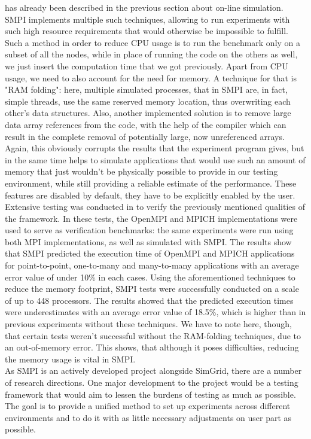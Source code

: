 has already been described in the previous section about on-line
simulation. SMPI implements multiple such techniques, allowing to run
experiments with such high resource requirements that would otherwise
be impossible to fulfill. Such a method in order to reduce CPU usage
is to run the
benchmark only on a subset of all the nodes, while in place of running
the code on the others as well, we just insert the computation time
that we got previously. Apart from CPU usage, we need to also account
for the need for memory. A technique for that is "RAM folding": here,
multiple simulated processes, that in SMPI are, in fact, simple
threads, use the same reserved memory location, thus overwriting each
other's data structures. Also, another implemented solution is to
remove large data array references from the code, with the help of the
compiler which can result in the complete removal of potentially
large, now unreferenced arrays. Again, this obviously corrupts the
results that the experiment program gives, but in the same time helps
to simulate applications that would use such an amount of memory that
just wouldn't be physically possible to provide in our testing
environment, while still providing a reliable estimate of the
performance.\cite{bdglmqssv13} These features are disabled by default,
they have to be explicitly enabled by the user.\\[0.3cm]
Extensive testing was conducted in \cite{csgscq11} to verify the
previously mentioned qualities of the framework. In these tests, the
OpenMPI and MPICH implementations were used to serve as verification
benchmarks: the same experiments were run using both MPI
implementations, as well as simulated with SMPI. The
results show that SMPI predicted the execution time of OpenMPI and
MPICH applications for point-to-point, one-to-many and many-to-many
applications with an average error value of under 10\% in each
cases. Using the aforementioned techniques to reduce the memory
footprint, SMPI tests
were successfully conducted on a scale of up to 448 processors. The
results showed that the predicted execution times were
underestimates with an average error value of 18.5\%, which is higher
than in previous experiments without these techniques. We have to note
here, though, that
certain tests weren't successful without the RAM-folding techniques,
due to an out-of-memory error. This shows, that although it poses
difficulties, reducing the memory usage is vital in SMPI.\\[0.3cm]
As SMPI is an actively developed project alongside SimGrid, there are
a number of research directions. One major development to the
project would be a testing framework that would aim to lessen the
burdens of testing as much as possible. The goal is to provide a
unified method to set up experiments across different environments and
to do it with as little necessary adjustments on user part as
possible.
